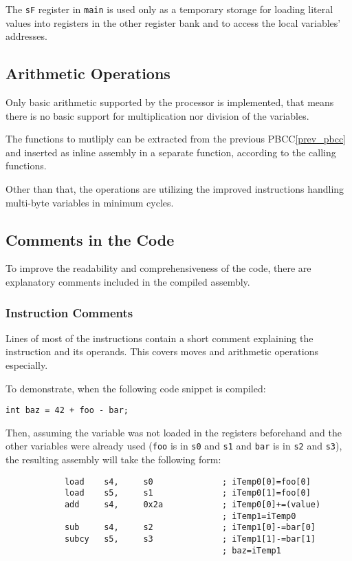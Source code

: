         The \texttt{sF} register in \texttt{main} is used only as a temporary storage for loading literal values into registers in the other register bank and to access the local variables' addresses.

        \subsection{Arithmetic Operations}

        Only basic arithmetic supported by the processor is implemented, that means there is no basic support for multiplication nor division of the variables.

        The functions to mutliply can be extracted from the previous PBCC\ref{prev_pbcc} and inserted as inline assembly in a separate function, according to the calling functions.

        Other than that, the operations are utilizing the improved instructions handling multi-byte variables in minimum cycles.

        \subsection{Comments in the Code}

        To improve the readability and comprehensiveness of the code, there are explanatory comments included in the compiled assembly.

            \subsubsection{Instruction Comments}

            Lines of most of the instructions contain a short comment explaining the instruction and its operands. This covers moves and arithmetic operations especially.

            To demonstrate, when the following code snippet is compiled:

            \begin{center}\texttt{int baz = 42 + foo - bar;}\end{center}

            Then, assuming the variable was not loaded in the registers beforehand and the other variables were already used (\texttt{foo} is in \texttt{s0} and \texttt{s1} and \texttt{bar} is in \texttt{s2} and \texttt{s3}), the resulting assembly will take the following form:

            \begin{center}
            \begin{verbatim}
            load    s4,     s0              ; iTemp0[0]=foo[0]
            load    s5,     s1              ; iTemp0[1]=foo[0]
            add     s4,     0x2a            ; iTemp0[0]+=(value)
                                            ; iTemp1=iTemp0
            sub     s4,     s2              ; iTemp1[0]-=bar[0]
            subcy   s5,     s3              ; iTemp1[1]-=bar[1]
                                            ; baz=iTemp1
            \end{verbatim}
            \end{center}

